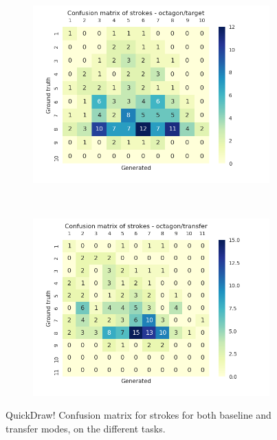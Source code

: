 \begin{figure}[!htbp]
      ~
      \begin{subfigure}[tb]{0.45\textwidth}
          \includegraphics[width=\textwidth]{images/sota/quickdraw_results/quickdraw_octagon_target_strokes_heatmap.png}
      \end{subfigure}
      ~
      \begin{subfigure}[tb]{0.45\textwidth}
          \includegraphics[width=\textwidth]{images/sota/quickdraw_results/quickdraw_octagon_transfer_strokes_heatmap.png}
      \end{subfigure}

      \caption{QuickDraw! Confusion matrix for strokes for both baseline and transfer modes, on the different tasks.}
      \label{fig:quickdraw_strokes_cnf}
    \end{figure}

